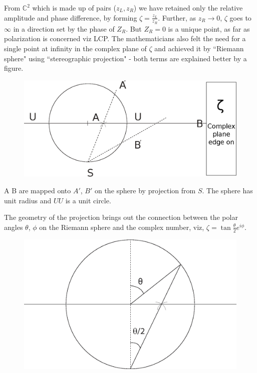 From $\mathbb{C}^2$ which is made up of pairs ($z_L , z_R$) we have retained only the relative
amplitude and phase difference, by forming $\zeta = \frac{z_L}{z_R}$. Further, as $z_R \to 0$, $\zeta$
goes to $\infty$ in a direction set by the phase of $Z_R$. But $Z_R = 0$ is a unique point,
as far as polarization is concerned viz LCP. The mathematicians also felt the
need for a single point at infinity in the complex plane of $\zeta$ and achieved it by
``Riemann sphere" using  ``stereographic projection" - both terms are explained
better by a figure.
\begin{figure}[H]
\centering
\includegraphics[scale=0.18]{src/images/chap26/4.jpg}
\end{figure}


A B are mapped onto $A'$, $B'$ on the sphere by projection from $S$. The sphere
has unit radius and $U U$ is a unit circle.


The geometry of the projection brings out the connection between the polar
angles $\theta$, $\phi$ on the Riemann sphere and the complex number, viz, $\zeta = \tan \frac{\theta}{2} e^{i\phi}$.
\begin{figure}[H]
\centering
\includegraphics[scale=0.18]{src/images/chap26/5.jpg}
\end{figure}

